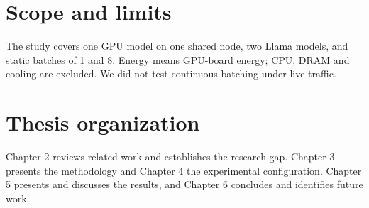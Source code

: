 \section{Scope and limits}
The study covers one GPU model on one shared node, two Llama models, and static batches of 1 and 8. Energy means GPU-board energy; CPU, DRAM and cooling are excluded. We did not test continuous batching under live traffic.

\section{Thesis organization}
Chapter 2 reviews related work and establishes the research gap. Chapter 3 presents the methodology and Chapter 4 the experimental configuration. Chapter 5 presents and discusses the results, and Chapter 6 concludes and identifies future work.

